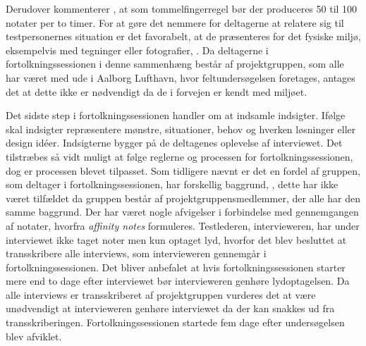 %
Derudover kommenterer \textcite[s. 116]{Book:CIInterpretationSession},  at som tommelfingerregel bør der produceres 50 til 100 notater per to timer. For at gøre det nemmere for deltagerne at relatere sig til testpersonernes situation er det favorabelt, at de præsenteres for det fysiske miljø, eksempelvis med tegninger eller fotografier, \parencite[s. 119]{Book:CIInterpretationSession}. Da deltagerne i fortolkningssessionen i denne sammenhæng består af projektgruppen, som alle har været med ude i Aalborg Lufthavn, hvor feltundersøgelsen foretages, antages det at dette ikke er nødvendigt da de i forvejen er kendt med miljøet. 

Det sidste step i fortolkningssessionen handler om at indsamle indsigter. Ifølge \textcite[s. 119]{Book:CIInterpretationSession} skal indsigter repræsentere mønstre, situationer, behov og hverken løsninger eller design idéer. Indsigterne bygger på de deltagenes oplevelse af interviewet. \blankline
%
Det tilstræbes så vidt muligt at følge reglerne og processen for fortolkningssessionen, dog er processen blevet tilpasset. Som tidligere nævnt er det en fordel af gruppen, som deltager i fortolkningssessionen, har forskellig baggrund, \parencite[s. 104]{Book:CIInterpretationSession}, dette har ikke været tilfældet da gruppen består af projektgruppensmedlemmer, der alle har den samme baggrund. Der har været nogle afvigelser i forbindelse med gennemgangen af notater, hvorfra \textit{affinity notes} formuleres. Testlederen, intervieweren, har under interviewet ikke taget noter men kun optaget lyd, hvorfor det blev besluttet at transskribere alle interviews, som intervieweren gennemgår i fortolkningssessionen. Det bliver anbefalet at hvis fortolkningssessionen starter mere end to dage efter interviewet bør intervieweren genhøre lydoptagelsen. Da alle interviews er transskriberet af projektgruppen vurderes det at være unødvendigt at intervieweren genhøre interviewet da der kan snakkes ud fra transskriberingen. Fortolkningssessionen startede fem dage efter undersøgelsen blev afviklet. 

